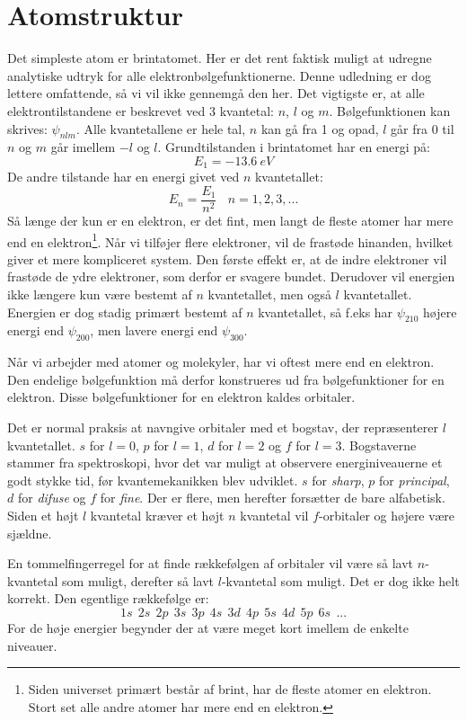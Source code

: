 \documentclass[../../Atom-ogMolekylefysik.tex]{subfiles}
\begin{document}
\section{Atomstruktur}
Det simpleste atom er brintatomet. Her er det rent faktisk muligt at udregne analytiske udtryk for alle elektronbølgefunktionerne. Denne udledning er dog lettere omfattende, så vi vil ikke gennemgå den her. Det vigtigste er, at alle elektrontilstandene er beskrevet ved 3 kvantetal: $n$, $l$ og $m$. Bølgefunktionen kan skrives: $\psi_{nlm}$.
Alle kvantetallene er hele tal, $n$ kan gå fra 1 og opad, $l$ går fra 0 til $n$ og $m$ går imellem $-l$ og $l$.
Grundtilstanden i brintatomet har en energi på:
\begin{equation}
E_1 = \SI{-13.6}{eV}    
\end{equation}
De andre tilstande har en energi givet ved $n$ kvantetallet:
\begin{equation}
    E_n = \frac{E_1}{n^2}~~~~n=1,2,3,...
\end{equation}
Så længe der kun er en elektron, er det fint, men langt de fleste atomer har mere end en elektron\footnote{Siden universet primært består af brint, har de fleste atomer en elektron. Stort set alle andre atomer har mere end en elektron.}.
Når vi tilføjer flere elektroner, vil de frastøde hinanden, hvilket giver et mere kompliceret system.
Den første effekt er, at de indre elektroner vil frastøde de ydre elektroner, som derfor er svagere bundet. Derudover vil energien ikke længere kun være bestemt af $n$ kvantetallet, men også $l$ kvantetallet. Energien er dog stadig primært bestemt af $n$ kvantetallet, så f.eks har $\psi_{210}$ højere energi end $\psi_{200}$, men lavere energi end $\psi_{300}$.

Når vi arbejder med atomer og molekyler, har vi oftest mere end en elektron. Den endelige bølgefunktion må derfor konstrueres ud fra bølgefunktioner for en elektron. Disse bølgefunktioner for en elektron kaldes orbitaler.

Det er normal praksis at navngive orbitaler med et bogstav, der repræsenterer $l$ kvantetallet. $s$ for $l=0$, $p$ for $l=1$, $d$ for $l=2$ og $f$ for $l=3$. Bogstaverne stammer fra spektroskopi, hvor det var muligt at observere energiniveauerne et godt stykke tid, før kvantemekanikken blev udviklet. $s$ for {\em sharp}, $p$ for {\em principal}, $d$ for {\em difuse} og $f$ for {\em fine}. Der er flere, men herefter forsætter de bare alfabetisk. Siden et højt $l$ kvantetal kræver et højt $n$ kvantetal vil $f$-orbitaler og højere være sjældne.

En tommelfingerregel for at finde rækkefølgen af orbitaler vil være så lavt $n$-kvantetal som muligt, derefter så lavt $l$-kvantetal som muligt. Det er dog ikke helt korrekt. Den egentlige rækkefølge er:
$$
1s~~2s~~2p~~3s~~3p~~4s~~3d~~4p~~5s~~4d~~5p~~6s~~...
$$
For de høje energier begynder der at være meget kort imellem de enkelte niveauer.
\end{document}
